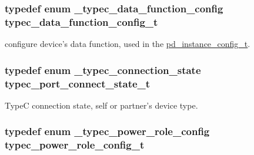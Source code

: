 \hypertarget{group__usb__pd__stack_ga92476c6b5b34316ccb766c9d2cadd29e}{
\subsubsection[{typec\-\_\-data\-\_\-function\-\_\-config\-\_\-t}]{\setlength{\rightskip}{0pt plus 5cm}typedef enum {\bf \-\_\-typec\-\_\-data\-\_\-function\-\_\-config}  {\bf typec\-\_\-data\-\_\-function\-\_\-config\-\_\-t}}}\label{group__usb__pd__stack_ga92476c6b5b34316ccb766c9d2cadd29e}


configure device's data function, used in the \hyperlink{group__usb__pd__stack_gafa6034f9e204836697da1f2fc996cbad}{pd\-\_\-instance\-\_\-config\-\_\-t}. 

\hypertarget{group__usb__pd__stack_ga416d720fe603166cb1c16443199d42f8}{
\subsubsection[{typec\-\_\-port\-\_\-connect\-\_\-state\-\_\-t}]{\setlength{\rightskip}{0pt plus 5cm}typedef enum {\bf \-\_\-typec\-\_\-connection\-\_\-state}  {\bf typec\-\_\-port\-\_\-connect\-\_\-state\-\_\-t}}}\label{group__usb__pd__stack_ga416d720fe603166cb1c16443199d42f8}


Type\-C connection state, self or partner's device type. 

\hypertarget{group__usb__pd__stack_ga8522facb45d87054c87e6d6fb32d9dd1}{
\subsubsection[{typec\-\_\-power\-\_\-role\-\_\-config\-\_\-t}]{\setlength{\rightskip}{0pt plus 5cm}typedef enum {\bf \-\_\-typec\-\_\-power\-\_\-role\-\_\-config}  {\bf typec\-\_\-power\-\_\-role\-\_\-config\-\_\-t}}}\label{group__usb__pd__stack_ga8522facb45d87054c87e6d6fb32d9dd1}


